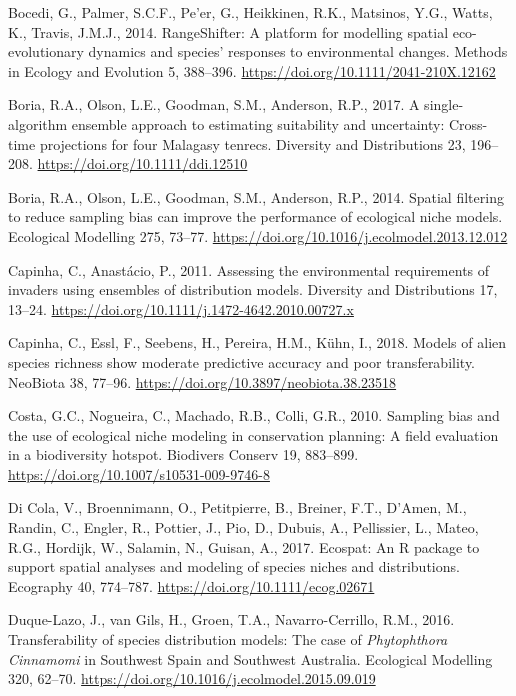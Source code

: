 \documentclass[12pt,]{article}
\begin{document}
\begin{CSLReferences}{1}{0}
\leavevmode\hypertarget{ref-Bocedi2014}{}%
Bocedi, G., Palmer, S.C.F., Pe'er, G., Heikkinen, R.K., Matsinos, Y.G.,
Watts, K., Travis, J.M.J., 2014. {RangeShifter}: A platform for
modelling spatial eco-evolutionary dynamics and species' responses to
environmental changes. Methods in Ecology and Evolution 5, 388--396.
\url{https://doi.org/10.1111/2041-210X.12162}

\leavevmode\hypertarget{ref-Boria2017}{}%
Boria, R.A., Olson, L.E., Goodman, S.M., Anderson, R.P., 2017. A
single-algorithm ensemble approach to estimating suitability and
uncertainty: Cross-time projections for four {Malagasy} tenrecs.
Diversity and Distributions 23, 196--208.
\url{https://doi.org/10.1111/ddi.12510}

\leavevmode\hypertarget{ref-Boria2014}{}%
Boria, R.A., Olson, L.E., Goodman, S.M., Anderson, R.P., 2014. Spatial
filtering to reduce sampling bias can improve the performance of
ecological niche models. Ecological Modelling 275, 73--77.
\url{https://doi.org/10.1016/j.ecolmodel.2013.12.012}

\leavevmode\hypertarget{ref-Capinha2011}{}%
Capinha, C., Anastácio, P., 2011. Assessing the environmental
requirements of invaders using ensembles of distribution models.
Diversity and Distributions 17, 13--24.
\url{https://doi.org/10.1111/j.1472-4642.2010.00727.x}

\leavevmode\hypertarget{ref-Capinha2018}{}%
Capinha, C., Essl, F., Seebens, H., Pereira, H.M., Kühn, I., 2018.
Models of alien species richness show moderate predictive accuracy and
poor transferability. NeoBiota 38, 77--96.
\url{https://doi.org/10.3897/neobiota.38.23518}

\leavevmode\hypertarget{ref-Costa2010}{}%
Costa, G.C., Nogueira, C., Machado, R.B., Colli, G.R., 2010. Sampling
bias and the use of ecological niche modeling in conservation planning:
A field evaluation in a biodiversity hotspot. Biodivers Conserv 19,
883--899. \url{https://doi.org/10.1007/s10531-009-9746-8}

\leavevmode\hypertarget{ref-DiCola2017}{}%
Di Cola, V., Broennimann, O., Petitpierre, B., Breiner, F.T., D'Amen,
M., Randin, C., Engler, R., Pottier, J., Pio, D., Dubuis, A.,
Pellissier, L., Mateo, R.G., Hordijk, W., Salamin, N., Guisan, A., 2017.
Ecospat: An {R} package to support spatial analyses and modeling of
species niches and distributions. Ecography 40, 774--787.
\url{https://doi.org/10.1111/ecog.02671}

\leavevmode\hypertarget{ref-Duque-Lazo2016}{}%
Duque-Lazo, J., van Gils, H., Groen, T.A., Navarro-Cerrillo, R.M., 2016.
Transferability of species distribution models: {The} case of
{\emph{Phytophthora}}{ \emph{Cinnamomi}} in {Southwest Spain} and
{Southwest Australia}. Ecological Modelling 320, 62--70.
\url{https://doi.org/10.1016/j.ecolmodel.2015.09.019}


\end{CSLReferences}
\end{document}

